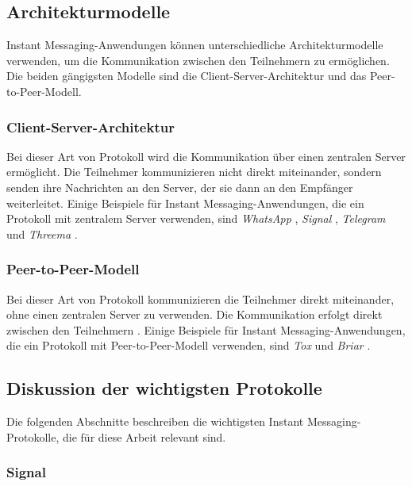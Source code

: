 \subsection{Architekturmodelle}

Instant Messaging-Anwendungen können unterschiedliche Architekturmodelle verwenden, um die Kommunikation zwischen den Teilnehmern zu ermöglichen. Die beiden gängigsten Modelle sind die Client-Server-Architektur und das Peer-to-Peer-Modell.

\subsubsection{Client-Server-Architektur}

Bei dieser Art von Protokoll wird die Kommunikation über einen zentralen Server ermöglicht. Die Teilnehmer kommunizieren nicht direkt miteinander, sondern senden ihre Nachrichten an den Server, der sie dann an den Empfänger weiterleitet\Parencite[S. 3]{Hanson_ServerManagement}. Einige Beispiele für Instant Messaging-Anwendungen, die ein Protokoll mit zentralem Server verwenden, sind \textit{WhatsApp} \parencite{Vanerio_WhatsAppArchitecture}, \textit{Signal} \parencite{Github_libsignal}, \textit{Telegram} \parencite{Telegram_ServerSourceCode} und \textit{Threema} \parencite{Threema_ServerLocation}.

\subsubsection{Peer-to-Peer-Modell}

Bei dieser Art von Protokoll kommunizieren die Teilnehmer direkt miteinander, ohne einen zentralen Server zu verwenden. Die Kommunikation erfolgt direkt zwischen den Teilnehmern \parencites[S. 6-8]{Mahlmann_P2PNetzwerke}{Galuba_P2POverlayNetworks}. Einige Beispiele für Instant Messaging-Anwendungen, die ein Protokoll mit Peer-to-Peer-Modell verwenden, sind \textit{Tox} \parencite{Tox_FAQ} und \textit{Briar} \parencite{Briar_HowItWorks}.


\subsection{Diskussion der wichtigsten Protokolle}

Die folgenden Abschnitte beschreiben die wichtigsten Instant Messaging-Protokolle, die für diese Arbeit relevant sind.

\subsubsection{Signal}
\label{subsubsection:signal}

